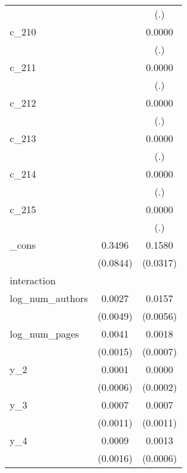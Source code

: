 {\begin{tabular}{l*{2}{c}}
            &                    &         (.)        \\
[1em]
c\_210       &                    &      0.0000        \\
            &                    &         (.)        \\
[1em]
c\_211       &                    &      0.0000        \\
            &                    &         (.)        \\
[1em]
c\_212       &                    &      0.0000        \\
            &                    &         (.)        \\
[1em]
c\_213       &                    &      0.0000        \\
            &                    &         (.)        \\
[1em]
c\_214       &                    &      0.0000        \\
            &                    &         (.)        \\
[1em]
c\_215       &                    &      0.0000        \\
            &                    &         (.)        \\
[1em]
\_cons      &      0.3496\sym{**}&      0.1580\sym{**}\\
            &    (0.0844)        &    (0.0317)        \\
\hline
interaction &                    &                    \\
log\_num\_authors&      0.0027        &      0.0157\sym{**}\\
            &    (0.0049)        &    (0.0056)        \\
[1em]
log\_num\_pages&      0.0041\sym{**}&      0.0018\sym{**}\\
            &    (0.0015)        &    (0.0007)        \\
[1em]
y\_2         &      0.0001        &      0.0000        \\
            &    (0.0006)        &    (0.0002)        \\
[1em]
y\_3         &      0.0007        &      0.0007        \\
            &    (0.0011)        &    (0.0011)        \\
[1em]
y\_4         &      0.0009        &      0.0013\sym{**}\\
            &    (0.0016)        &    (0.0006)        \\

\end{tabular}}
